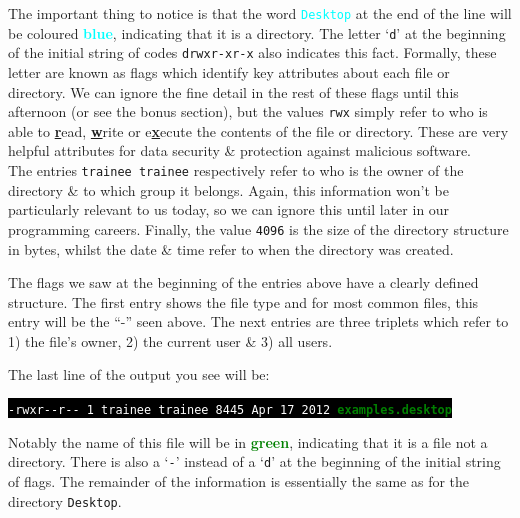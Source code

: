 \documentclass[a4paper,12pt,twoside]{memoir}
\begin{document}
\begin{information}
The important thing to notice is that the word \textcolor{cyan}{\texttt{Desktop}} at the end of the line will be coloured \textcolor{cyan}{\textbf{blue}}, indicating that it is a directory.
The letter `\texttt{d}' at the beginning of the initial string of codes \texttt{drwxr-xr-x} also indicates this fact.
Formally, these letter are known as flags which identify key attributes about each file or directory.
We can ignore the fine detail in the rest of these flags until this afternoon (or see the bonus section), but the values \texttt{rwx} simply refer to who is able to \textbf{\underline{r}}ead, \textbf{\underline{w}}rite or e\textbf{\underline{x}}ecute the contents of the file or directory. 
These are very helpful attributes for data security \& protection against malicious software.\\

The entries \texttt{trainee trainee} respectively refer to who is the owner of the directory \& to which group it belongs.
Again, this information won't be particularly relevant to us today, so we can ignore this until later in our programming careers.
Finally, the value \texttt{4096} is the size of the directory structure in bytes, whilst the date \& time refer to when the directory was created.\\

\begin{bonus}
The flags we saw at the beginning of the entries above have a clearly defined structure. 
The first entry shows the file type and for most common files, this entry will be the ``-'' seen above.
The next entries are three triplets which refer to 1) the file's owner, 2) the current user \& 3) all users.
\end{bonus}

The last line of the output you see will be: 
\begin{center}
\colorbox{black}{\texttt{\textcolor{white}{-rwxr-{}-r-{}- 1 trainee trainee 8445 Apr 17 2012} \textcolor{green}{\textbf{examples.desktop}}}}\\
\end{center}
Notably the name of this file will be in \textcolor{green}{\textbf{green}}, indicating that it is a file not a directory.
There is also a `\texttt{-}' instead of a `\texttt{d}' at the beginning of the initial string of flags. 
The remainder of the information is essentially the same as for the directory \texttt{Desktop}.\\
\end{information}
\end{document}
